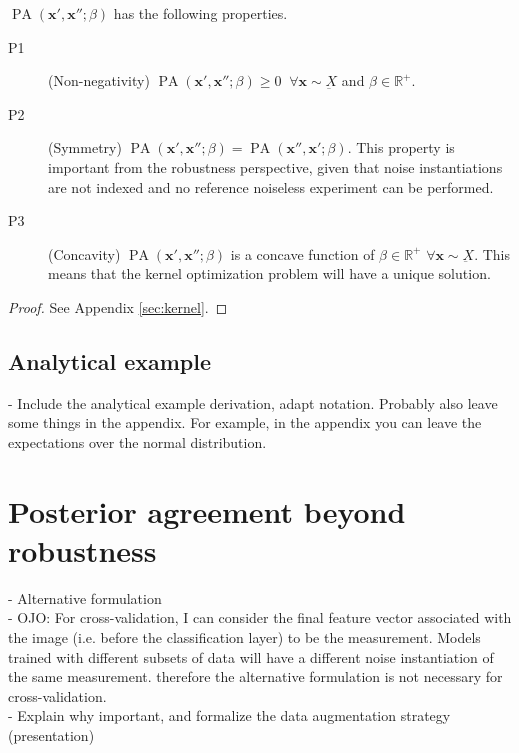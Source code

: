 \begin{theorem}
    $\operatorname{PA}\left(\bm{x}', \bm{x}'' ; \beta\right)$ has the following properties.

    \begin{description}
        \item[P1](Non-negativity) $\operatorname{PA}\left(\bm{x}', \bm{x}'' ; \beta\right) \geq 0 \;\; \forall \bm{x} \sim \underbar{X}$ and $\beta \in \mathbb{R}^+$.
        \item[P2](Symmetry)  $\operatorname{PA}\left(\bm{x}', \bm{x}'' ; \beta\right) = \operatorname{PA}\left(\bm{x}'', \bm{x}'; \beta\right)$. This property is 
        important from the robustness perspective, given that noise
        instantiations are not indexed and no reference noiseless experiment can be performed.
        \item[P3](Concavity) $\operatorname{PA}\left(\bm{x}', \bm{x}'' ; \beta\right)$ is a concave function of $\beta \in \mathbb{R}^+$ $\forall \bm{x} \sim \underbar{X}$. This means that 
        the kernel optimization problem will have a unique solution.
    \end{description}
\end{theorem}

\begin{proof}
    See Appendix \ref{sec:kernel}.
\end{proof}

\subsection{Analytical example}

- Include the analytical example derivation, adapt notation. Probably also leave
some things in the appendix. For example, in the appendix you can leave the expectations
over the normal distribution.


\section{Posterior agreement beyond robustness}

- Alternative formulation \\
- OJO: For cross-validation, I can consider the final feature vector associated with the image
(i.e. before the classification layer) to be the measurement. Models trained with different
subsets of data will have a different noise instantiation of the same measurement. therefore
the alternative formulation is not necessary for cross-validation. \\
- Explain why important, and formalize the data augmentation strategy (presentation) \\

